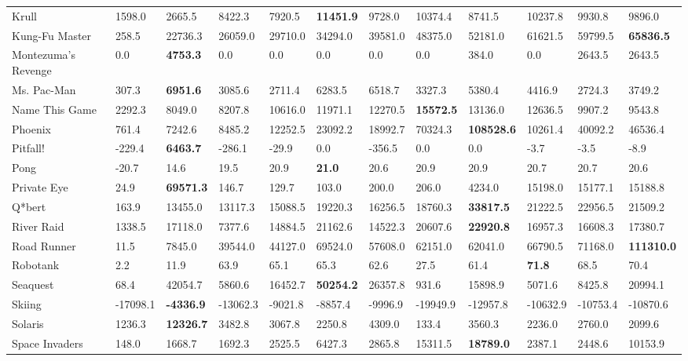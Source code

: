 \documentclass{article}
\begin{document}
\begin{table}[h]
\begin{scriptsize}
\begin{sc}
\begin{tabular}{| p{2.4cm} p{0.84cm} p{0.84cm} p{0.84cm} p{0.84cm} p{0.84cm} p{0.84cm} p{0.84cm} p{0.84cm} p{0.84cm} p{0.84cm} p{0.84cm} |}
Krull & 1598.0 & 2665.5 & 8422.3 & 7920.5 & {\bf 11451.9} & 9728.0 & 10374.4 & 8741.5 & 10237.8 & 9930.8 & 9896.0\\
Kung-Fu Master & 258.5 & 22736.3 & 26059.0 & 29710.0 & 34294.0 & 39581.0 & 48375.0 & 52181.0 & 61621.5 & 59799.5 & {\bf 65836.5}\\
Montezuma's Revenge & 0.0 & {\bf 4753.3} & 0.0 & 0.0 & 0.0 & 0.0 & 0.0 & 384.0 & 0.0 & 2643.5 & 2643.5\\
Ms. Pac-Man & 307.3 & {\bf 6951.6} & 3085.6 & 2711.4 & 6283.5 & 6518.7 & 3327.3 & 5380.4 & 4416.9 & 2724.3 & 3749.2\\
Name This Game & 2292.3 & 8049.0 & 8207.8 & 10616.0 & 11971.1 & 12270.5 & {\bf 15572.5} & 13136.0 & 12636.5 & 9907.2 & 9543.8\\
Phoenix & 761.4 & 7242.6 & 8485.2 & 12252.5 & 23092.2 & 18992.7 & 70324.3 & {\bf 108528.6} & 10261.4 & 40092.2 & 46536.4\\
Pitfall!  & -229.4 & {\bf 6463.7} & -286.1 & -29.9 & 0.0 & -356.5 & 0.0 & 0.0 & -3.7 & -3.5 & -8.9\\
Pong & -20.7 & 14.6 & 19.5 & 20.9 & {\bf 21.0} & 20.6 & 20.9 & 20.9 & 20.7 & 20.7 & 20.6\\
Private Eye & 24.9 & {\bf 69571.3} & 146.7 & 129.7 & 103.0 & 200.0 & 206.0 & 4234.0 & 15198.0 & 15177.1 & 15188.8\\
Q*bert & 163.9 & 13455.0 & 13117.3 & 15088.5 & 19220.3 & 16256.5 & 18760.3 & {\bf 33817.5} & 21222.5 & 22956.5 & 21509.2\\
River Raid & 1338.5 & 17118.0 & 7377.6 & 14884.5 & 21162.6 & 14522.3 & 20607.6 & {\bf 22920.8} & 16957.3 & 16608.3 & 17380.7\\
Road Runner & 11.5 & 7845.0 & 39544.0 & 44127.0 & 69524.0 & 57608.0 & 62151.0 & 62041.0 & 66790.5 & 71168.0 & {\bf 111310.0}\\
Robotank & 2.2 & 11.9 & 63.9 & 65.1 & 65.3 & 62.6 & 27.5 & 61.4 & {\bf 71.8} & 68.5 & 70.4\\
Seaquest & 68.4 & 42054.7 & 5860.6 & 16452.7 & {\bf 50254.2} & 26357.8 & 931.6 & 15898.9 & 5071.6 & 8425.8 & 20994.1\\
Skiing & -17098.1 & {\bf -4336.9} & -13062.3 & -9021.8 & -8857.4 & -9996.9 & -19949.9 & -12957.8 & -10632.9 & -10753.4 & -10870.6\\
Solaris & 1236.3 & {\bf 12326.7} & 3482.8 & 3067.8 & 2250.8 & 4309.0 & 133.4 & 3560.3 & 2236.0 & 2760.0 & 2099.6\\
Space Invaders & 148.0 & 1668.7 & 1692.3 & 2525.5 & 6427.3 & 2865.8 & 15311.5 & {\bf 18789.0} & 2387.1 & 2448.6 & 10153.9\\

\end{tabular}
\end{sc}
\end{scriptsize}
\end{table}
\end{document}
